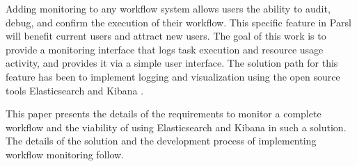 Adding monitoring to any workflow system allows users the ability to audit, debug, and confirm the execution of their workflow.
This specific feature in Parsl will benefit current users and attract new users.
The goal of this work is to provide a monitoring interface that logs task execution and resource usage activity, and provides it via a simple user interface.
The solution path for this feature has been to implement logging and visualization using the open source tools Elasticsearch and Kibana \cite{ElasticsearchKibana}.

This paper presents the details of the requirements to monitor a complete workflow and the viability of using Elasticsearch and Kibana in such a solution.
The details of the solution and the development process of implementing workflow monitoring follow.
